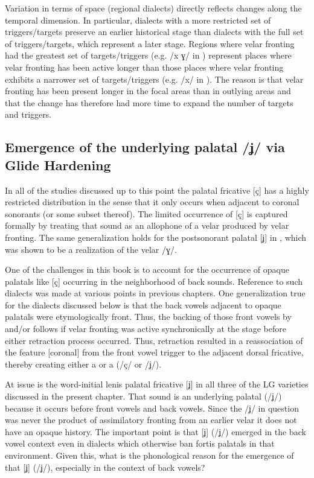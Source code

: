 Variation in terms of space (regional dialects) directly reflects changes along the temporal dimension. In particular, dialects with a more restricted set of triggers/targets preserve an earlier historical stage than dialects with the full set of triggers/targets, which represent a later stage. Regions where velar fronting had the greatest set of targets/triggers (e.g. /x ɣ/ in ) represent places where velar fronting has been active longer than those places where velar fronting exhibits a narrower set of targets/triggers (e.g. /x/ in ). The reason is that velar fronting has been present longer in the focal areas than in outlying areas and that the change has therefore had more time to expand the number of targets and triggers.

\subsection{Emergence of the underlying palatal /ʝ/ via Glide Hardening}\label{sec:4.5.2}

In all of the studies discussed up to this point the palatal fricative [ç] has a highly restricted distribution in the sense that it only occurs when adjacent to coronal sonorants (or some subset thereof). The limited occurrence of [ç] is captured formally by treating that sound as an allophone of a velar produced by velar fronting. The same generalization holds for the postsonorant palatal [ʝ] in , which was shown to be a realization of the velar /ɣ/.

One of the challenges in this book is to account for the occurrence of opaque palatals like [ç] occurring in the neighborhood of back sounds. Reference to such dialects was made at various points in previous chapters. One generalization true for the dialects discussed below is that the back vowels adjacent to opaque palatals were etymologically front. Thus, the backing of those front vowels by  and/or  follows if velar fronting was active synchronically at the stage before either retraction process occurred. Thus, retraction resulted in a reassociation of the feature [coronal] from the front vowel trigger to the adjacent dorsal fricative, thereby creating either a  or a  (/ç/ or /ʝ/).

At issue is the word-initial lenis palatal fricative [ʝ] in all three of the LG varieties discussed in the present chapter. That sound is an underlying palatal (/ʝ/) because it occurs before front vowels and back vowels. Since the /ʝ/ in question was never the product of assimilatory fronting from an earlier velar it does not have an opaque history. The important point is that [ʝ] (/ʝ/) emerged in the back vowel context even in dialects which otherwise ban fortis palatals in that environment. Given this, what is the phonological reason for the emergence of that [ʝ] (/ʝ/), especially in the context of back vowels?

